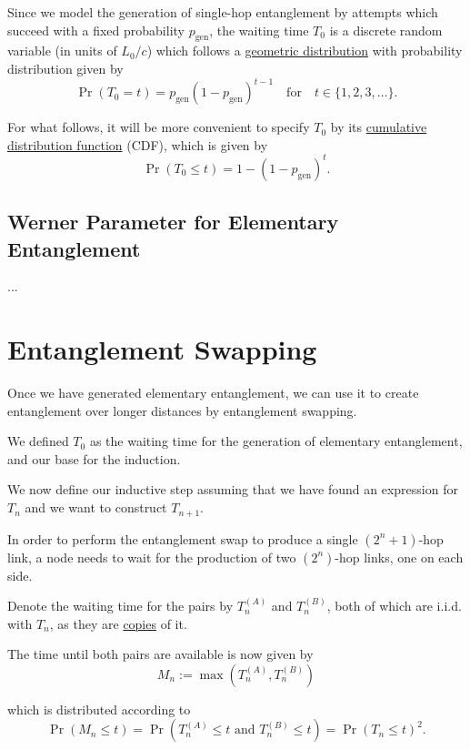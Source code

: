 \documentclass{masterthesis}
\begin{document}
Since we model the generation of single-hop entanglement by attempts which succeed with a fixed probability $p_{\text{gen}}$, the waiting time $T_0$ is a discrete random variable (in units of $L_0 /c$) which follows a \hyperref[section:geometric_distribution]{geometric distribution} with probability distribution given by 
\begin{equation}
    \Pr(T_0 = t) = p_{\text{gen}} (1 - p_{\text{gen}})^{t-1} \quad \text{for} \quad t \in \{1, 2, 3, \ldots \}.
\end{equation}

For what follows, it will be more convenient to specify $T_0$ by its \hyperref[subsection:geometric_cdf]{cumulative distribution function} (CDF), which is given by
\begin{equation}
    \Pr(T_0 \leq t) = 1 - (1 - p_{\text{gen}})^t.
\end{equation}

\subsection*{Werner Parameter for Elementary Entanglement}
... %

\section*{Entanglement Swapping}

Once we have generated elementary entanglement, we can use it to create entanglement over longer distances by entanglement swapping.

We defined $T_0$ as the waiting time for the generation of elementary entanglement, and our base for the induction.

We now define our inductive step assuming that we have found an expression for $T_n$ and we want to construct $T_{n+1}$. 

In order to perform the entanglement swap to produce a single $(2^n+1)$-hop link, a node needs to wait for the production of two $(2^n)$-hop links, one on each side. 

Denote the waiting time for the pairs by $T_n^{(A)}$ and $T_n^{(B)}$, both of which are i.i.d. with $T_n$, as they are \hyperref[paragraph:copies_of_a_random_variable]{copies} of it. 

The time until both pairs are available is now given by
\begin{equation}
    M_n := \max(T_n^{(A)} , T_n^{(B)})
\end{equation}

which is distributed according to
\begin{equation}
    \Pr(M_n \leq t) = \Pr(T_n^{(A)} \leq t \text{ and } T_n^{(B)} \leq t) = \Pr(T_n \leq t) ^ 2.
\end{equation}
\end{document}
